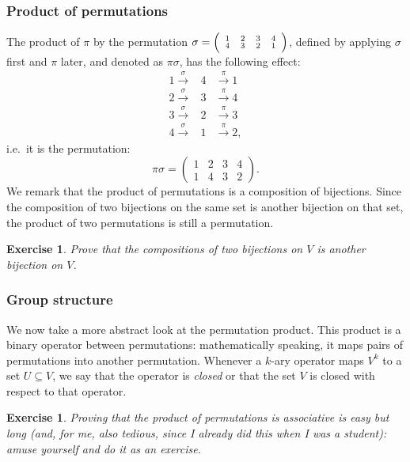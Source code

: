 \documentclass[a4paper]{book}
\theoremstyle{changebreak}                %
\newtheorem{ex}[result]{Exercise}
\begin{document}
\subsubsection{Product of permutations}
The product of $\pi$ by the permutation
$\sigma=\left({\scriptsize\begin{array}{cccc}1&2&3&4\\[-0.2em]4&3&2&1\end{array}}\right)$,
defined by applying $\sigma$ first and $\pi$ later, and denoted as
$\pi\sigma$, has the following effect:
\begin{eqnarray*}
  1\xrightarrow{\sigma} &4& \xrightarrow{\pi} 1 \\
  2\xrightarrow{\sigma} &3& \xrightarrow{\pi} 4 \\
  3\xrightarrow{\sigma} &2& \xrightarrow{\pi} 3 \\
  4\xrightarrow{\sigma} &1& \xrightarrow{\pi} 2, 
\end{eqnarray*}
i.e.~it is the permutation:
\begin{equation*}
  \pi\sigma=\left(
  \begin{array}{cccc} 1 & 2 & 3 & 4 \\ 1 & 4 & 3 & 2 \end{array}
      \right).
\end{equation*}
We remark that the product of permutations is a
composition of bijections. Since
the composition of two bijections on the same set is another bijection
on that set, the product of two permutations is still a permutation.

\begin{ex}
Prove that the compositions of two bijections on $V$ is another
bijection on $V$.
\end{ex}

\subsubsection{Group structure}
We now take a more abstract look at the permutation product. This
product is a binary operator between permutations: mathematically
speaking, it maps pairs of permutations into another
permutation. Whenever a $k$-ary operator maps
$V^k$ to a set $U\subseteq V$, we say that the operator is {\it
  closed} or that the set $V$ is
closed with respect to that operator.

\begin{ex}
Proving that the product of permutations is
associative is easy but long (and, for me,
also tedious, since I already did this when I was a student): amuse
yourself and do it as an exercise.
\end{ex}
\end{document}
